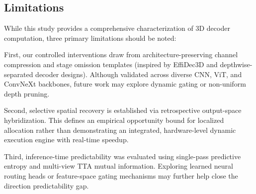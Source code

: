 \subsection{Limitations}
\label{sec:limitations}

While this study provides a comprehensive characterization of 3D decoder computation, three primary limitations should be noted:

First, our controlled interventions draw from architecture-preserving channel compression and stage omission templates (inspired by EffiDec3D and depthwise-separated decoder designs). Although validated across diverse CNN, ViT, and ConvNeXt backbones, future work may explore dynamic gating or non-uniform depth pruning.

Second, selective spatial recovery is established via retrospective output-space hybridization. This defines an empirical opportunity bound for localized allocation rather than demonstrating an integrated, hardware-level dynamic execution engine with real-time speedup.

Third, inference-time predictability was evaluated using single-pass predictive entropy and multi-view TTA mutual information. Exploring learned neural routing heads or feature-space gating mechanisms may further help close the direction predictability gap.
